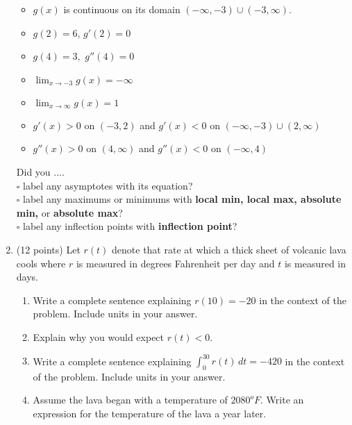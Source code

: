 \documentclass[12pt]{article}
\renewcommand{\emph}[1]{\textsf{\textbf{#1}}}
\begin{document}
\begin{enumerate}
\begin{minipage}{0.7\textwidth}
\end{minipage}
\hspace*{-.5in}
\begin{minipage}{0.3\textwidth}
\begin{itemize}
\item $g(x)$ is continuous on its domain $(-\infty,-3) \cup (-3,\infty).$
\item $g(2)=6$, $g'(2)=0$
\item $g(4)=3,$ $g''(4)=0$
\item $\displaystyle \lim_{x \to -3} g(x)=-\infty$
\item $\displaystyle \lim_{x \to \infty} g(x)=1$
\item $g'(x)>0$ on $(-3,2)$ and $g'(x)<0$ on $(-\infty,-3)\cup(2,\infty)$
\item $g''(x)>0$ on $(4,\infty)$ and $g''(x)<0$ on $(-\infty,4)$
\end{itemize}
\end{minipage}
\vfill
Did you ....\\
$\square$ label any asymptotes with its equation?\\
$\square$ label any maximums or minimums with \emph{local min, local max, absolute min,} or \emph{absolute max}?\\
$\square$ label any inflection points with \emph{inflection point}?\\
\newpage
\item (12 points) Let $r(t)$ denote that rate at which a thick sheet of volcanic lava cools where $r$ is measured in degrees Fahrenheit per day and $t$ is measured in days. 
\begin{enumerate}
\item Write a complete sentence explaining $r(10)=-20$ in the context of the problem. Include units in your answer. 
\vfill
\item Explain why you would expect $r(t) < 0.$
\vfill
\item Write a complete sentence explaining $\int_0^{30} r(t) \, dt = -420$ in the context of the problem. Include units in your answer. 
\vfill
\item Assume the lava began with a temperature of $2080^oF.$ Write an expression for the temperature of the lava a year later.
\vfill
\end{enumerate}


\end{enumerate}
\end{document}
